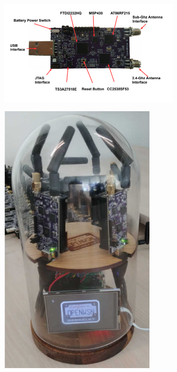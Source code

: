 \documentclass[sensors,article,submit,moreauthors,pdftex]{Definitions/mdpi}
\newcommand{\update}[1]     {\textcolor{blue}{#1}}
\begin{document}
\begin{figure}
	\centering
	\begin{subfigure}{0.69\columnwidth}
    	\centering
    	\includegraphics[width=1.00\columnwidth]{openmoteb}
        \subcaption{\update{The OpenMote~B}}
        \label{fig:openmoteb}
	\end{subfigure}
	\begin{subfigure}{0.24\columnwidth}
		\centering
    	\includegraphics[width=1.00\columnwidth]{ot_box}

\end{subfigure}
\end{figure}
\end{document}
